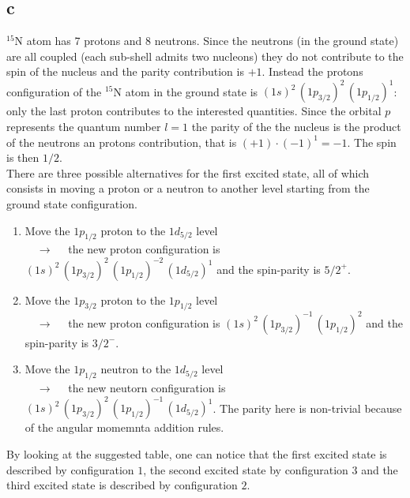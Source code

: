 \subsection*{c}
$^{15}$N atom has 7 protons and 8 neutrons. Since the neutrons (in the ground state) are all coupled (each sub-shell admits two nucleons) they do not contribute to  the spin of the nucleus and the parity contribution is $+1$. Instead the protons configuration
of the $^{15}$N atom in the ground state is $(1s)^2 \, (1p_{3/2})^2 \, (1p_{1/2})^1$: only the last proton contributes to the interested quantities. Since the orbital $p$ represents the quantum number $l=1$ the parity of the the nucleus is the product of the neutrons 
an protons contribution, that is $(+1) \cdot (-1)^1 = -1$. The spin is then $1/2$. \\
There are three possible alternatives for the first excited state, all of which consists in moving a proton or a neutron to another level starting from the ground state configuration.
\begin{enumerate}
    \item Move the $1p_{1/2}$ proton to the $1d_{5/2}$ level \\ $\quad \longrightarrow \quad$ the new proton configuration is $(1s)^2 \, (1p_{3/2})^2 \, (1p_{1/2})^{-2} \, (1d_{5/2})^1$ and the spin-parity is $5/2^+$.
    \item Move the $1p_{3/2}$ proton to the $1p_{1/2}$ level \\ $\quad \longrightarrow \quad$ the new proton configuration is $(1s)^2 \, (1p_{3/2})^{-1} \, (1p_{1/2})^2$ and the spin-parity is $3/2^-$.
    \item Move the $1p_{1/2}$ neutron to the $1d_{5/2}$ level \\ $\quad \longrightarrow \quad $ the new neutorn configuration is $(1s)^2 \, (1p_{3/2})^2 \, (1p_{1/2})^{-1} \, (1d_{5/2})^1$. The parity here is non-trivial because of the angular momemnta addition rules.
\end{enumerate}
By looking at the suggested table, one can notice that the first excited state is described by configuration $1$, the second excited state by configuration $3$ and the third excited state is described by configuration $2$.


